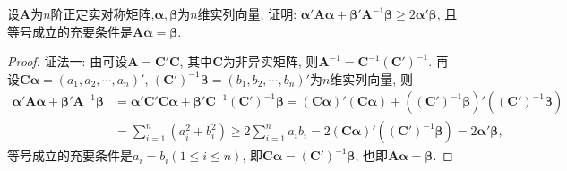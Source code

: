 \documentclass[../../main.tex]{subfiles}%
\begin{document}
\begin{example}
设$\boldsymbol{A}$为$n$阶正定实对称矩阵,$\boldsymbol{\alpha}, \boldsymbol{\beta}$为$n$维实列向量, 证明: $\boldsymbol{\alpha}'\boldsymbol{A}\boldsymbol{\alpha}+\boldsymbol{\beta}'\boldsymbol{A}^{-1}\boldsymbol{\beta}\geqslant  2\boldsymbol{\alpha}'\boldsymbol{\beta}$, 且等号成立的充要条件是$\boldsymbol{A}\boldsymbol{\alpha}=\boldsymbol{\beta}$.
\end{example}
\begin{proof}

{\color{blue}证法一:}
由可设$\boldsymbol{A}=\boldsymbol{C}'\boldsymbol{C}$, 其中$\boldsymbol{C}$为非异实矩阵, 则$\boldsymbol{A}^{-1}=\boldsymbol{C}^{-1}(\boldsymbol{C}')^{-1}$. 再设$\boldsymbol{C}\boldsymbol{\alpha}=(a_1, a_2, \cdots, a_n)'$, $(\boldsymbol{C}')^{-1}\boldsymbol{\beta}=(b_1, b_2, \cdots, b_n)'$为$n$维实列向量, 则
\begin{align*}
\boldsymbol{\alpha}'\boldsymbol{A}\boldsymbol{\alpha}+\boldsymbol{\beta}'\boldsymbol{A}^{-1}\boldsymbol{\beta} 
&= \boldsymbol{\alpha}'\boldsymbol{C}'\boldsymbol{C}\boldsymbol{\alpha}+\boldsymbol{\beta}'\boldsymbol{C}^{-1}(\boldsymbol{C}')^{-1}\boldsymbol{\beta}
= (\boldsymbol{C}\boldsymbol{\alpha})'(\boldsymbol{C}\boldsymbol{\alpha})+((\boldsymbol{C}')^{-1}\boldsymbol{\beta})'((\boldsymbol{C}')^{-1}\boldsymbol{\beta})\\
&= \sum_{i = 1}^n (a_i^2 + b_i^2)\geqslant  2\sum_{i = 1}^n a_ib_i = 2(\boldsymbol{C}\boldsymbol{\alpha})'((\boldsymbol{C}')^{-1}\boldsymbol{\beta}) = 2\boldsymbol{\alpha}'\boldsymbol{\beta},
\end{align*}
等号成立的充要条件是$a_i = b_i (1\leqslant  i\leqslant  n)$, 即$\boldsymbol{C}\boldsymbol{\alpha}=(\boldsymbol{C}')^{-1}\boldsymbol{\beta}$, 也即$\boldsymbol{A}\boldsymbol{\alpha}=\boldsymbol{\beta}$. 


\end{proof}
\end{document}
